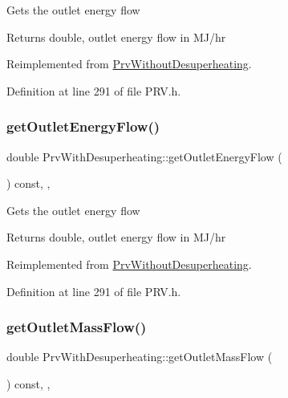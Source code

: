 Gets the outlet energy flow \begin{DoxyReturn}{Returns}
double, outlet energy flow in M\+J/hr 
\end{DoxyReturn}


Reimplemented from \hyperlink{class_prv_without_desuperheating_a6529a68ffa444ae87c890b2bcbc2cc84}{Prv\+Without\+Desuperheating}.



Definition at line 291 of file P\+R\+V.\+h.

\mbox{\label{class_prv_with_desuperheating_a2394fb62e4fc85252fc4eb15f08e9f1e}} 
\subsubsection{\texorpdfstring{get\+Outlet\+Energy\+Flow()}{getOutletEnergyFlow()}\hspace{0.1cm}{\footnotesize\ttfamily [3/3]}}
{\footnotesize\ttfamily double Prv\+With\+Desuperheating\+::get\+Outlet\+Energy\+Flow (\begin{DoxyParamCaption}{ }\end{DoxyParamCaption}) const\hspace{0.3cm}{\ttfamily [inline]}, {\ttfamily [override]}, {\ttfamily [virtual]}}

Gets the outlet energy flow \begin{DoxyReturn}{Returns}
double, outlet energy flow in M\+J/hr 
\end{DoxyReturn}


Reimplemented from \hyperlink{class_prv_without_desuperheating_a6529a68ffa444ae87c890b2bcbc2cc84}{Prv\+Without\+Desuperheating}.



Definition at line 291 of file P\+R\+V.\+h.

\mbox{\label{class_prv_with_desuperheating_a76c03ff2f54c85cd0c80543f23549635}} 
\subsubsection{\texorpdfstring{get\+Outlet\+Mass\+Flow()}{getOutletMassFlow()}\hspace{0.1cm}{\footnotesize\ttfamily [1/3]}}
{\footnotesize\ttfamily double Prv\+With\+Desuperheating\+::get\+Outlet\+Mass\+Flow (\begin{DoxyParamCaption}{ }\end{DoxyParamCaption}) const\hspace{0.3cm}{\ttfamily [inline]}, {\ttfamily [override]}, {\ttfamily [virtual]}}

